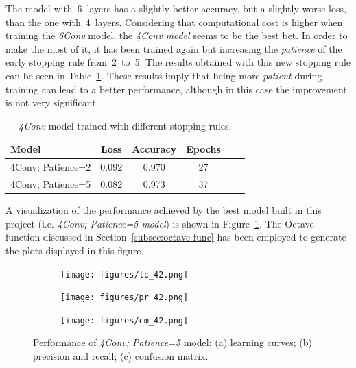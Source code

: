 The model with~6~layers has a slightly better accuracy, but a slightly worse loss, than the one with~4~layers. Considering that computational cost is higher when training the \textit{6Conv} model, the \emph{\textit{4Conv} model} seems to be the best bet. In order to make the most of it, it has been trained again but increasing the \emph{\textit{patience}} of the early stopping rule from~2~to~5. The results obtained with this new stopping rule can be seen in Table~\ref{tbl:arch_patience5}. These results imply that being more \textit{patient} during training can lead to a better performance, although in this case the improvement is not very significant.
\begin{table}
	\centering
	\begin{tabular}{l*{4}{c}r}
		\textbf{Model} & \textbf{Loss} & \textbf{Accuracy} & \textbf{Epochs} \\
		\hline
		4Conv; Patience=2 & 0.092 & 0.970 & 27 \\
		4Conv; Patience=5 & 0.082 & 0.973 & 37 \\
	\end{tabular}
	\caption{\textit{4Conv} model trained with different stopping rules.}
	\label{tbl:arch_patience5}
\end{table}

A visualization of the performance achieved by the best model built in this project (i.e. \emph{4Conv; Patience=5 model}) is shown in Figure~\ref{fig:best}. The Octave function discussed in Section~\ref{subsec:octave-func} has been employed to generate the plots displayed in this figure.

\begin{figure}
	\centering
	\begin{subfigure}{1\textwidth}
		\centering
		\texttt{[image: figures/lc\_42.png]}
		\caption{}
	\end{subfigure}
	\begin{subfigure}{0.5\textwidth}
		\centering
		\texttt{[image: figures/pr\_42.png]}
		\caption{}
	\end{subfigure}%
	\begin{subfigure}{0.5\textwidth}
		\centering
		\texttt{[image: figures/cm\_42.png]}
		\caption{}
	\end{subfigure}
	\caption{Performance of \textit{4Conv; Patience=5} model: (a) learning curves; (b) precision and recall; (c) confusion matrix.}
	\label{fig:best}
\end{figure}